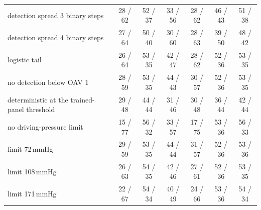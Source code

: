 \documentclass[11pt]{article}
\begin{document}
\begin{table}
\begin{tabular}{lcccccc}
detection spread 3 binary steps & 28 / 62 & 52 / 37 & 33 / 56 & 28 / 62 & 46 / 43 & 51 / 38 \\
detection spread 4 binary steps & 27 / 64 & 50 / 40 & 30 / 60 & 28 / 63 & 39 / 50 & 48 / 42 \\
logistic tail & 26 / 64 & 53 / 35 & 42 / 47 & 28 / 62 & 52 / 36 & 53 / 35 \\
no detection below OAV 1 & 28 / 59 & 53 / 35 & 44 / 43 & 30 / 57 & 52 / 36 & 53 / 35 \\
deterministic at the trained-panel threshold & 29 / 48 & 44 / 44 & 31 / 46 & 30 / 48 & 36 / 44 & 42 / 44 \\
no driving-pressure limit & 15 / 77 & 56 / 32 & 33 / 57 & 17 / 75 & 53 / 36 & 56 / 33 \\
limit 72\,mmHg & 29 / 59 & 53 / 35 & 44 / 44 & 31 / 57 & 52 / 36 & 53 / 36 \\
limit 108\,mmHg & 26 / 63 & 54 / 35 & 42 / 46 & 27 / 61 & 52 / 36 & 53 / 35 \\
limit 171\,mmHg & 22 / 67 & 54 / 34 & 40 / 49 & 24 / 66 & 53 / 36 & 54 / 34 \\
\bottomrule
\end{tabular}
\end{table}
\end{document}
